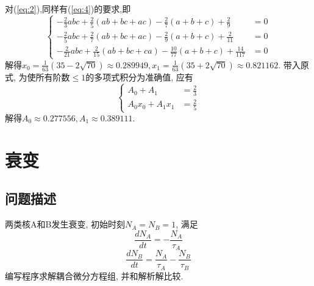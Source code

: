 \documentclass[UTF-8]{article}
\begin{document}
对(\ref{eq:2}),同样有(\ref{eq:4})的要求,即
\begin{equation}
\left\lbrace
\begin{split}
-\frac{2}{3} a b c+\frac{2}{5}(ab+bc+ac)-\frac{2}{7}(a+b+c)+\frac{2}{9}&=0\\
-\frac{2}{5} a b c+\frac{2}{7}(ab+bc+ac)-\frac{2}{9}(a+b+c)+\frac{2}{11}&=0\\
-\frac{2}{21}abc+\frac{2}{15}(ab+bc+ca)-\frac{10}{77}(a+b+c)+\frac{14}{117}&=0
\end{split}
\right.
\end{equation}
解得$x_0=\frac{1}{63}(35-2 \sqrt{70})\approx 0.289949,  x_1=\frac{1}{63}(35+2 \sqrt{70})\approx 0.821162$. 带入原式, 为使所有阶数$\leqslant1$的多项式积分为准确值, 应有
\begin{equation}
\left\lbrace
\begin{split}
A_0+A_1&=\frac{2}{3}\\
A_0 x_0+A_1 x_1&=\frac{2}{5}
\end{split}
\right.
\end{equation}
解得$A_0\approx0.277556, A_1\approx0.389111$.

\section{衰变}
\subsection{问题描述}
两类核A和B发生衰变, 初始时刻$N_A=N_B=1$, 满足
\begin{equation} 
\frac{d N_{A}}{d t}=-\frac{N_{A}}{\tau_{A}}
\end{equation}
\begin{equation}
	\frac{d N_{B}}{d t}=\frac{N_{A}}{\tau_{A}}-\frac{N_{B}}{\tau_{B}}
\end{equation}
编写程序求解耦合微分方程组, 并和解析解比较.
\end{document}

